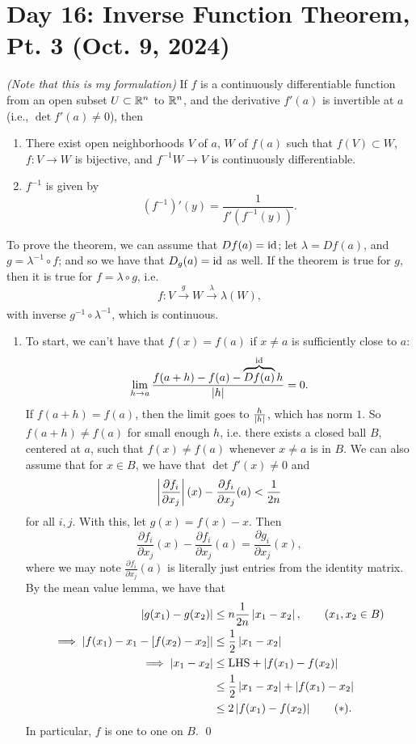 \section{Day 16: Inverse Function Theorem, Pt. 3 (Oct. 9, 2024)}
\textit{(Note that this is my formulation)} If $f$ is a continuously differentiable function from an open subset $U \subset \mathbb R^n$ to $\mathbb R^n$, and the derivative $f'(a)$ is invertible at $a$ (i.e., $\det f'(a) \neq 0$), then
\begin{enumerate}[label=(\alph*)]
    \item There exist open neighborhoods $V$ of $a$, $W$ of $f(a)$ such that $f(V) \subset W$, $f : V \to W$ is bijective, and $f^{-1} W \to V$ is continuously differentiable.
    \item $f^{-1}$ is given by
    \[ (f^{-1})'(y) = \frac{1}{f'(f^{-1}(y))}. \]
\end{enumerate}
To prove the theorem, we can assume that $Df(a) = \mathrm{id}$; let $\lambda = Df(a)$, and $g = \lambda^{-1} \circ f$; and so we have that $D_g(a) = \mathrm{id}$ as well. If the theorem is true for $g$, then it is true for $f = \lambda \circ g$, i.e.
\[ f : V \xrightarrow[]{g} W \xrightarrow[]{\lambda} \lambda(W), \]
with inverse $g^{-1} \circ \lambda^{-1}$, which is continuous.
\begin{enumerate}[label=(\alph*)]
    \item To start, we can't have that $f(x) = f(a)$ if $x \neq a$ is sufficiently close to $a$:
    \[ \lim_{h \to a} \frac{f(a + h)- f(a) - \overbrace{Df(a)}^{\mathrm{id}}h}{\left\lvert h \right\rvert} = 0. \]
    If $f(a + h) = f(a)$, then the limit goes to $\frac{h}{\left\lvert h \right\rvert}$, which has norm $1$. So $f(a + h) \neq f(a)$ for small enough $h$, i.e. there exists a closed ball $B$, centered at $a$, such that $f(x) \neq f(a)$ whenever $x \neq a$ is in $B$.
    \medskip\newline
    We can also assume that for $x \in B$, we have that $\det f'(x) \neq 0$ and
    \[ \left\lvert \frac{\partial f_i}{\partial x_j} \right\rvert (x) - \frac{\partial f_i}{\partial x_j}(a) < \frac{1}{2n} \]
    for all $i, j$. With this, let $g(x) = f(x) - x$. Then
    \[ \frac{\partial f_i}{\partial x_j}(x) - \frac{\partial f_i}{\partial x_j}(a) = \frac{\partial g_i}{\partial x_j}(x), \]
    where we may note $\frac{\partial f_i}{\partial x_j}(a)$ is literally just entries from the identity matrix. By the mean value lemma, we have that
    \begin{align*}
        \left\lvert g(x_1) - g(x_2) \right\rvert &\leq n \frac{1}{2n} \left\lvert x_1 - x_2 \right\rvert, \tag{$x_1, x_2 \in B$} \\
        \implies \left\lvert f(x_1) - x_1 - [f(x_2) - x_2] \right\rvert &\leq \frac{1}{2} \left\lvert x_1 - x_2 \right\rvert \\
        \implies \left\lvert x_1 - x_2 \right\rvert &\leq \mathrm{LHS} + \left\lvert f(x_1) - f(x_2) \right\rvert \\
        &\leq \frac{1}{2}\left\lvert x_1 - x_2 \right\rvert + \left\lvert f(x_1) - x_2 \right\rvert \\
        &\leq 2 \left\lvert f(x_1) - f(x_2) \right\rvert \tag{$\ast$}.
    \end{align*}
    In particular, $f$ is one to one on $B$. \qed   
\end{enumerate}

